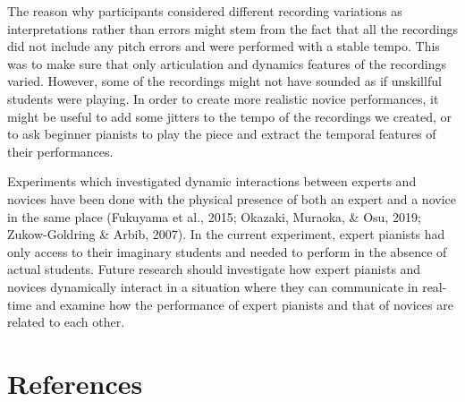 \documentclass[
  man,floatsintext]{apa6}
\begin{document}
The reason why participants considered different recording variations as interpretations rather than errors might stem from the fact that all the recordings did not include any pitch errors and were performed with a stable tempo. This was to make sure that only articulation and dynamics features of the recordings varied. However, some of the recordings might not have sounded as if unskillful students were playing. In order to create more realistic novice performances, it might be useful to add some jitters to the tempo of the recordings we created, or to ask beginner pianists to play the piece and extract the temporal features of their performances.

Experiments which investigated dynamic interactions between experts and novices have been done with the physical presence of both an expert and a novice in the same place (Fukuyama et al., 2015; Okazaki, Muraoka, \& Osu, 2019; Zukow-Goldring \& Arbib, 2007). In the current experiment, expert pianists had only access to their imaginary students and needed to perform in the absence of actual students. Future research should investigate how expert pianists and novices dynamically interact in a situation where they can communicate in real-time and examine how the performance of expert pianists and that of novices are related to each other.

\clearpage

\hypertarget{references}{%
\section{References}\label{references}}

\begingroup
\setlength{\parindent}{-0in}
\setlength{\leftskip}{0in}
\end{document}
